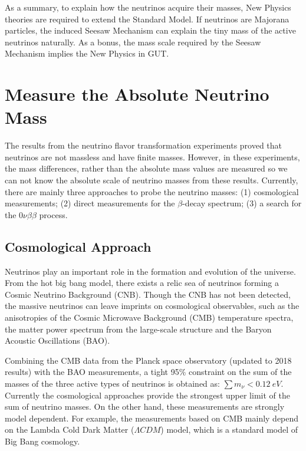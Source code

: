 As a summary, to explain how the neutrinos acquire their masses, New Physics theories are required to extend the Standard Model. If neutrinos are Majorana particles, the induced Seesaw Mechanism can explain the tiny mass of the active neutrinos naturally. As a bonus, the mass scale required by the Seesaw Mechanism implies the New Physics in GUT.

\section{Measure the Absolute Neutrino Mass}

The results from the neutrino flavor transformation experiments proved that neutrinos are not massless and have finite masses. However, in these experiments, the mass differences, rather than the absolute mass values are measured so we can not know the absolute scale of neutrino masses from these results. Currently, there are mainly three approaches to probe the neutrino masses: (1) cosmological measurements; (2) direct measurements for the $\beta$-decay spectrum; (3) a search for the $0\nu\beta\beta$ process\cite{valle2015neutrinos}. 

\subsection{Cosmological Approach}
Neutrinos play an important role in the formation and evolution of the universe. From the hot big bang model, there exists a relic sea of neutrinos forming a Cosmic Neutrino Background (CNB)\cite{lesgourgues2013neutrino}. Though the CNB has not been detected, the massive neutrinos can leave imprints on cosmological observables, such as the anisotropies of the Cosmic Microwave Background (CMB) temperature spectra, the matter power spectrum from the large-scale structure and the Baryon Acoustic Oscillations (BAO)\cite{dvorkin2019neutrino,gerbino2018status}.

Combining the CMB data from the Planck space observatory (updated to 2018 results) with the BAO measurements, a tight 95\% constraint on the sum of the masses of the three active types of neutrinos is obtained as: $\sum m_\nu<0.12~eV$\cite{aghanim2020planck}. Currently the cosmological approaches provide the strongest upper limit of the sum of neutrino masses\cite{dvorkin2019neutrino}. On the other hand, these measurements are strongly model dependent. For example, the measurements based on CMB mainly depend on the Lambda Cold Dark Matter ($\Lambda CDM$) model, which is a standard model of Big Bang cosmology.


